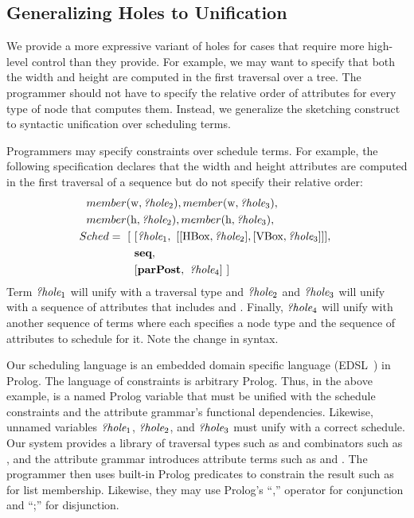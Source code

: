 \subsection{Generalizing Holes to Unification}
We provide a more expressive variant of holes for cases that require more high-level control than they provide. For example, we may want to specify that both the width and height are computed in the first traversal over a tree. The programmer should not have to specify the relative order of attributes for every type of node that computes them. Instead, we generalize the sketching construct to syntactic unification over scheduling terms. 

Programmers may specify constraints over schedule terms. For example, the following specification declares that the width and height attributes are computed in the first traversal of a sequence but do not specify their relative order:
\begin{align*}
member(&\text{w}, {\emph{?hole}}_2), member(\text{w}, {\emph{?hole}}_3),\\
member(&\text{h}, {\emph{?hole}}_2), member(\text{h}, {\emph{?hole}}_3),\\
Sched = ~[&~[ {\emph{?hole}}_1, ~ [ [\text{HBox}, {\emph{?hole}}_2], [\text{VBox}, {\emph{?hole}}_3]]], ~\\
& ~ \textbf{seq},\\
& ~  [\text{\textbf{parPost}}, ~{\emph{?hole}}_4]~]
\end{align*}
Term ${\emph{?hole}}_1$ will unify with a traversal type and ${\emph{?hole}}_2$ and ${\emph{?hole}}_3$ will unify with a sequence of attributes that includes  and . Finally, ${\emph{?hole}}_4$ will unify with another sequence of terms where each specifies a node type and the sequence of attributes to schedule for it. Note the change in syntax.

Our scheduling language is an embedded domain specific language (EDSL~\cite{??}) in Prolog. The language of constraints is arbitrary Prolog. Thus, in the above example,  is a named Prolog variable that must be unified with the schedule constraints and the attribute grammar's functional dependencies. Likewise, unnamed variables ${\emph{?hole}}_1$, ${\emph{?hole}}_2$, and ${\emph{?hole}}_3$ must unify with a correct schedule. Our system provides a library of traversal types such as  and combinators such as , and the attribute grammar introduces attribute terms such as  and . The programmer then uses built-in Prolog predicates to constrain the result such as  for list membership. Likewise, they may use Prolog's ``,'' operator for conjunction and ``;'' for disjunction. 

